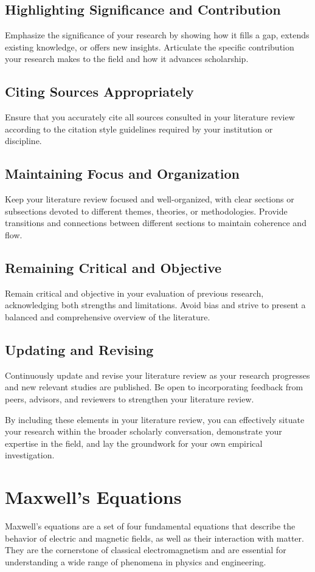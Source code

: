 \subsection{Highlighting Significance and Contribution}
Emphasize the significance of your research by showing how it fills a gap, extends existing knowledge, or offers new insights.
Articulate the specific contribution your research makes to the field and how it advances scholarship.
    
\subsection{Citing Sources Appropriately}
Ensure that you accurately cite all sources consulted in your literature review according to the citation style guidelines required by your institution or discipline.

\subsection{Maintaining Focus and Organization}
Keep your literature review focused and well-organized, with clear sections or subsections devoted to different themes, theories, or methodologies.
Provide transitions and connections between different sections to maintain coherence and flow.

\subsection{Remaining Critical and Objective}
Remain critical and objective in your evaluation of previous research, acknowledging both strengths and limitations.
Avoid bias and strive to present a balanced and comprehensive overview of the literature.

\subsection{Updating and Revising}
Continuously update and revise your literature review as your research progresses and new relevant studies are published.
Be open to incorporating feedback from peers, advisors, and reviewers to strengthen your literature review.

By including these elements in your literature review, you can effectively situate your research within the broader scholarly conversation, demonstrate your expertise in the field, and lay the groundwork for your own empirical investigation.


\section{Maxwell's Equations}
Maxwell's equations are a set of four fundamental equations that describe the behavior of electric and magnetic fields, as well as their interaction with matter.
They are the cornerstone of classical electromagnetism and are essential for understanding a wide range of phenomena in physics and engineering.

